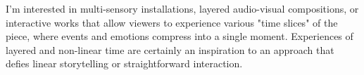 
I'm interested in multi-sensory installations, layered audio-visual compositions, or interactive works that allow viewers to experience various "time slices" of the piece, where events and emotions compress into a single moment. Experiences of layered and non-linear time are certainly an inspiration to an approach that defies linear storytelling or straightforward interaction.

